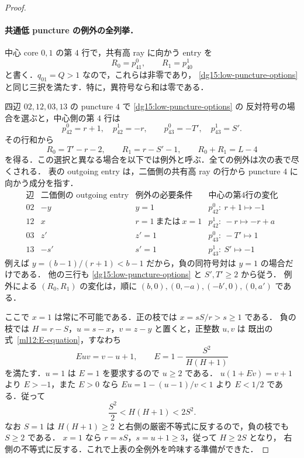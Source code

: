 \begin{proof}
\paragraph{共通低 puncture の例外の全列挙．}
中心 core $0,1$ の第 $4$ 行で，共有高 ray に向かう entry を
\[
 R_0=p^0_{41},\qquad R_1=p^1_{40}
\]
と書く．$q_{01}=Q>1$ なので，これらは非零であり，
\eqref{dg15:low-puncture-options} と同じ三択を満たす．特に，異符号なら和は零である．

四辺 $02,12,03,13$ の puncture $4$ で \eqref{dg15:low-puncture-options} の
反対符号の場合を選ぶと，中心側の第 $4$ 行は
\[
 p^0_{42}=r+1,\quad p^1_{42}=-r,\qquad
 p^0_{43}=-T',\quad p^1_{43}=S'.
\]
その行和から
\begin{equation}\label{dg15:central-baseline}
 R_0=T'-r-2,\qquad R_1=r-S'-1,\qquad R_0+R_1=L-4
\end{equation}
を得る．この選択と異なる場合を以下では例外と呼ぶ．全ての例外は次の表で尽くされる．
表の outgoing entry は，二価側の共有高 ray の行から puncture $4$ に向かう成分を指す．
\[
\begin{array}{c|c|c|c}
 \text{辺}&\text{二価側の outgoing entry}&\text{例外の必要条件}&
 \text{中心の第4行の変化}\\\hline
 02&-y&y=1&p^0_{42}:\ r+1\longmapsto-1\\
 12&x&r=1\ \text{または}\ x=1&p^1_{42}:\ -r\longmapsto -r+a\\
 03&z'&z'=1&p^0_{43}:\ -T'\longmapsto1\\
 13&-s'&s'=1&p^1_{43}:\ S'\longmapsto-1
\end{array}
\]
例えば $y=(b-1)/(r+1)<b-1$ だから，負の同符号対は $y=1$ の場合だけである．
他の三行も \eqref{dg15:low-puncture-options} と $S',T'\geq2$ から従う．
例外による $(R_0,R_1)$ の変化は，順に $(b,0),(0,-a),(-b',0),(0,a')$ である．

ここで $x=1$ は常に不可能である．正の枝では $x=sS/r>s\geq1$ である．
負の枝では $H=r-S$，$u=s-x$，$v=z-y$ と置くと，正整数 $u,v$ は
既出の式~\eqref{ml12:E-equation}，すなわち
\begin{equation}\label{dg15:negative-identity}
 Euv=v-u+1,\qquad E=1-\frac{S^2}{H(H+1)}
\end{equation}
を満たす．$u=1$ は $E=1$ を要求するので $u\geq2$ である．
$u(1+Ev)=v+1$ より $E>-1$，また $E>0$ なら
$Eu=1-(u-1)/v<1$ より $E<1/2$ である．従って
\begin{equation}\label{dg15:negative-range}
 \frac{S^2}{2}<H(H+1)<2S^2.
\end{equation}
なお $S=1$ は $H(H+1)\geq2$ と右側の厳密不等式に反するので，負の枝でも $S\geq2$ である．
$x=1$ なら $r=sS$，$s=u+1\geq3$，従って $H\geq2S$ となり，
右側の不等式に反する．これで上表の全例外を吟味する準備ができた．


\end{proof}
